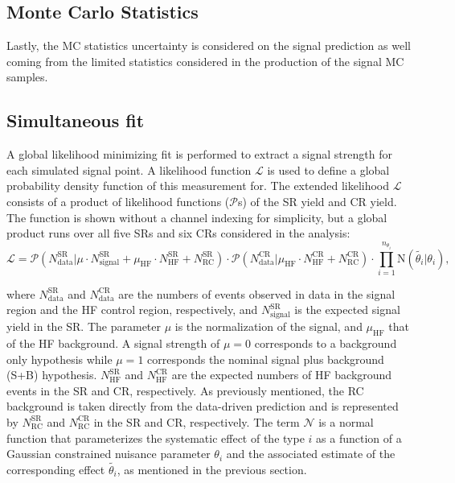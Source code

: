 \subsection*{Monte Carlo Statistics}
Lastly, the MC statistics uncertainty is considered on the signal prediction as well coming from the limited statistics considered in the production of the signal MC samples.

\subsection{Simultaneous fit}
A global likelihood minimizing fit is performed to extract a signal strength for each simulated signal point. A likelihood function $\mathcal{L}$ is used to define a global probability density function of this measurement for. The extended likelihood $\mathcal{L}$ consists of a product of likelihood functions ($\mathcal{P}$s) of the SR yield and CR yield. The function is shown without a channel indexing for simplicity, but a global product runs over all five SRs and six CRs considered in the analysis:
\begin{equation}
\label{eqn:likelihood}
    \mathcal{L} = \mathcal{P}( N_{\mathrm{data}}^{\mathrm{SR}}| \mu \cdot N_{\mathrm{signal}}^{\mathrm{SR}} + 
    \mu_{\mathrm{HF}}  \cdot N_{\mathrm{HF}}^{\mathrm{SR}} + N_{\mathrm{RC}}^{\mathrm{SR}} ) \cdot 
    \mathcal{P}(N_{\mathrm{data}}^{\mathrm{CR}} | \mu_{\mathrm{HF}}\cdot N_{\mathrm{HF}}^{\mathrm{CR}} + N_{\mathrm{RC}}^{\mathrm{CR}}) \cdot                                                    \prod_{i=1}^{n_{\theta_i}}\mathrm{N}(\tilde{\theta_i}| \theta_i),
\end{equation}

where $N_{\mathrm{data}}^{\mathrm{SR}}$ and $N_{\mathrm{data}}^{\mathrm{CR}}$ are the numbers of events observed in data in the signal region and the HF control region, respectively, and $N_{\mathrm{signal}}^{\mathrm{SR}}$ is the expected signal yield in the SR. The parameter $\mu$ is the normalization of the signal, and $\mu_{\mathrm{HF}}$ that of the HF background. A signal strength of $\mu=0$ corresponds to a background only hypothesis while $\mu=1$ corresponds the nominal signal plus background (S+B) hypothesis. $N_{\mathrm{HF}}^{\mathrm{SR}}$ and $N_{\mathrm{HF}}^{\mathrm{CR}}$ are the expected numbers of HF background events in the SR and CR, respectively. As previously mentioned, the RC background is taken directly from the data-driven prediction and is represented by $N_{\mathrm{RC}}^{\mathrm{SR}}$ and $N_{\mathrm{RC}}^{\mathrm{CR}}$ in the SR and CR, respectively.  The term $\mathcal{N}$ is a normal function that parameterizes the systematic effect of the type $i$ as a function of a Gaussian constrained nuisance parameter $\theta_i$ and the associated estimate of the corresponding effect $\tilde{\theta_i}$, as mentioned in the previous section. 


